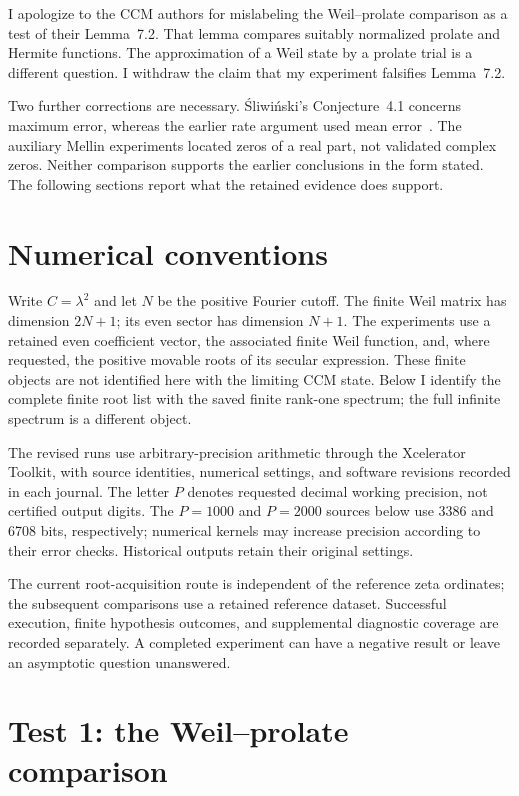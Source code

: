 \documentclass[11pt,a4paper]{article}
\begin{document}
I apologize to the CCM authors for mislabeling the Weil--prolate
comparison as a test of their Lemma~7.2. That lemma compares suitably
normalized prolate and Hermite functions. The approximation of a
Weil state by a prolate trial is a different question. I withdraw
the claim that my experiment falsifies Lemma~7.2.

Two further corrections are necessary. \'Sliwi\'nski's
Conjecture~4.1 concerns maximum error, whereas the earlier rate
argument used mean error~\cite{Sliwinski2026}. The auxiliary Mellin
experiments located zeros of a real part, not validated complex zeros.
Neither comparison supports the earlier conclusions in the form
stated. The following sections report what the retained evidence
does support.

\section{Numerical conventions}

Write $C=\lambda^2$ and let $N$ be the positive Fourier cutoff.
The finite Weil matrix has dimension $2N+1$; its even sector has
dimension $N+1$. The experiments use a retained even coefficient
vector, the associated finite Weil function, and, where requested,
the positive movable roots of its secular expression. These finite
objects are not identified here with the limiting CCM state. Below I
identify the complete finite root list with the saved finite rank-one
spectrum; the full infinite spectrum is a different object.

The revised runs use arbitrary-precision arithmetic through the
Xcelerator Toolkit, with source identities, numerical settings, and
software revisions recorded in each journal. The letter $P$ denotes
requested decimal working precision, not certified output digits.
The $P=1000$ and $P=2000$ sources below use 3386 and 6708 bits,
respectively; numerical kernels may increase precision according to
their error checks. Historical outputs retain their original settings.

The current root-acquisition route is independent of the reference
zeta ordinates; the subsequent comparisons use a retained reference
dataset. Successful execution, finite hypothesis outcomes, and
supplemental diagnostic coverage are recorded separately. A completed
experiment can have a negative result or leave an asymptotic question
unanswered.

\section{Test 1: the Weil--prolate comparison}
\label{sec:prolate}
\end{document}
